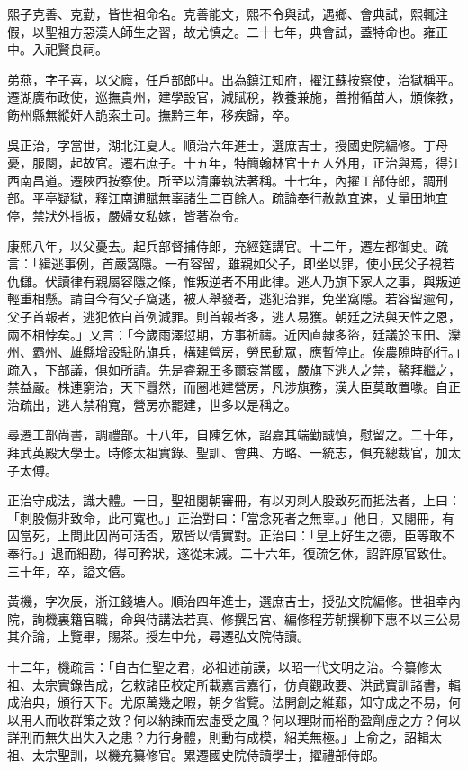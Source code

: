 \begin{pinyinscope}
熙子克善、克勤，皆世祖命名。克善能文，熙不令與試，遇鄉、會典試，熙輒注假，以聖祖方惡漢人師生之習，故尤慎之。二十七年，典會試，蓋特命也。雍正中。入祀賢良祠。

弟燕，字子喜，以父廕，任戶部郎中。出為鎮江知府，擢江蘇按察使，治獄稱平。遷湖廣布政使，巡撫貴州，建學設官，減賦稅，教養兼施，善拊循苗人，頒條教，飭州縣無縱奸人詭索土司。撫黔三年，移疾歸，卒。

吳正治，字當世，湖北江夏人。順治六年進士，選庶吉士，授國史院編修。丁母憂，服闋，起故官。遷右庶子。十五年，特簡翰林官十五人外用，正治與焉，得江西南昌道。遷陜西按察使。所至以清廉執法著稱。十七年，內擢工部侍郎，調刑部。平亭疑獄，釋江南逋賦無辜諸生二百餘人。疏論奉行赦款宜速，丈量田地宜停，禁狀外指扳，嚴婦女私嫁，皆著為令。

康熙八年，以父憂去。起兵部督捕侍郎，充經筵講官。十二年，遷左都御史。疏言：「緝逃事例，首嚴窩隱。一有容留，雖親如父子，即坐以罪，使小民父子視若仇讎。伏讀律有親屬容隱之條，惟叛逆者不用此律。逃人乃旗下家人之事，與叛逆輕重相懸。請自今有父子窩逃，被人舉發者，逃犯治罪，免坐窩隱。若容留逾旬，父子首報者，逃犯依自首例減罪。則首報者多，逃人易獲。朝廷之法與天性之恩，兩不相悖矣。」又言：「今歲雨澤愆期，方事祈禱。近因直隸多盜，廷議於玉田、灤州、霸州、雄縣增設駐防旗兵，構建營房，勞民動眾，應暫停止。俟農隙時酌行。」疏入，下部議，俱如所請。先是睿親王多爾袞當國，嚴旗下逃人之禁，鰲拜繼之，禁益嚴。株連窮治，天下囂然，而圈地建營房，凡涉旗務，漢大臣莫敢置喙。自正治疏出，逃人禁稍寬，營房亦罷建，世多以是稱之。

尋遷工部尚書，調禮部。十八年，自陳乞休，詔嘉其端勤誠慎，慰留之。二十年，拜武英殿大學士。時修太祖實錄、聖訓、會典、方略、一統志，俱充總裁官，加太子太傅。

正治守成法，識大體。一日，聖祖閱朝審冊，有以刃刺人股致死而抵法者，上曰：「刺股傷非致命，此可寬也。」正治對曰：「當念死者之無辜。」他日，又閱冊，有囚當死，上問此囚尚可活否，眾皆以情實對。正治曰：「皇上好生之德，臣等敢不奉行。」退而細勘，得可矜狀，遂從末減。二十六年，復疏乞休，詔許原官致仕。三十年，卒，謚文僖。

黃機，字次辰，浙江錢塘人。順治四年進士，選庶吉士，授弘文院編修。世祖幸內院，詢機裏籍官職，命與侍講法若真、修撰呂宮、編修程芳朝撰柳下惠不以三公易其介論，上覽畢，賜茶。授左中允，尋遷弘文院侍讀。

十二年，機疏言：「自古仁聖之君，必祖述前謨，以昭一代文明之治。今纂修太祖、太宗實錄告成，乞敕諸臣校定所載嘉言嘉行，仿貞觀政要、洪武寶訓諸書，輯成治典，頒行天下。尤原萬幾之暇，朝夕省覽。法開創之維艱，知守成之不易，何以用人而收群策之效？何以納諫而宏虛受之風？何以理財而裕酌盈劑虛之方？何以詳刑而無失出失入之患？力行身體，則動有成模，紹美無極。」上俞之，詔輯太祖、太宗聖訓，以機充纂修官。累遷國史院侍讀學士，擢禮部侍郎。


\end{pinyinscope}

